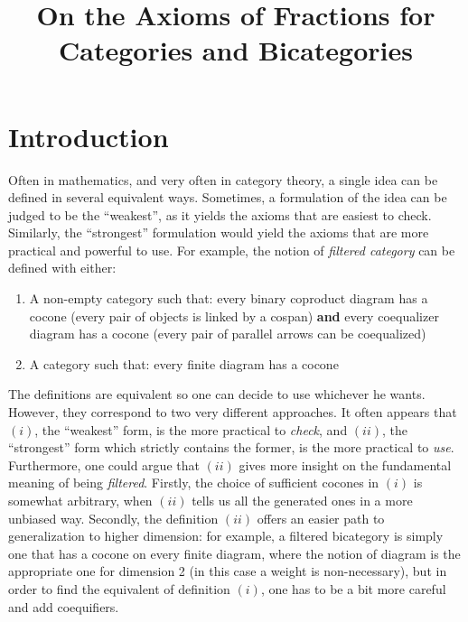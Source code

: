 \documentclass{article}
\title{On the Axioms of Fractions for Categories and Bicategories}
\author{}
\date{}
\numberwithin{equation}{section}
\theoremstyle{definition}
\theoremstyle{plain}
\begin{document}
	
\maketitle

\tableofcontents

\newpage

\section{Introduction}

Often in mathematics, and very often in category theory, a single idea can be defined in several equivalent ways. Sometimes, a formulation of the idea can be judged to be the ``weakest'', as it yields the axioms that are easiest to check. Similarly, the ``strongest'' formulation would yield the axioms that are more practical and powerful to use. For example, the notion of \textit{filtered category} can be defined with either:

\begin{enumerate}[label = $(\roman*)$]
	\item A non-empty category such that: every binary coproduct diagram has a cocone (every pair of objects is linked by a cospan) \textbf{and} every coequalizer diagram has a cocone (every pair of parallel arrows can be coequalized)
	\item A category such that: every finite diagram has a cocone
\end{enumerate}

The definitions are equivalent so one can decide to use whichever he wants. However, they correspond to two very different approaches. It often appears that $(i)$, the ``weakest'' form, is the more practical to \textit{check}, and $(ii)$, the ``strongest'' form which strictly contains the former, is the more practical to \textit{use}. Furthermore, one could argue that $(ii)$ gives more insight on the fundamental meaning of being \textit{filtered}. Firstly, the choice of sufficient cocones in $(i)$ is somewhat arbitrary, when $(ii)$ tells us all the generated ones in a more unbiased way. Secondly, the definition $(ii)$ offers an easier path to generalization to higher dimension: for example, a filtered bicategory is simply one that has a cocone on every finite diagram, where the notion of diagram is the appropriate one for dimension 2 (in this case a weight is non-necessary), but in order to find the equivalent of definition $(i)$, one has to be a bit more careful and add coequifiers.
\end{document}
